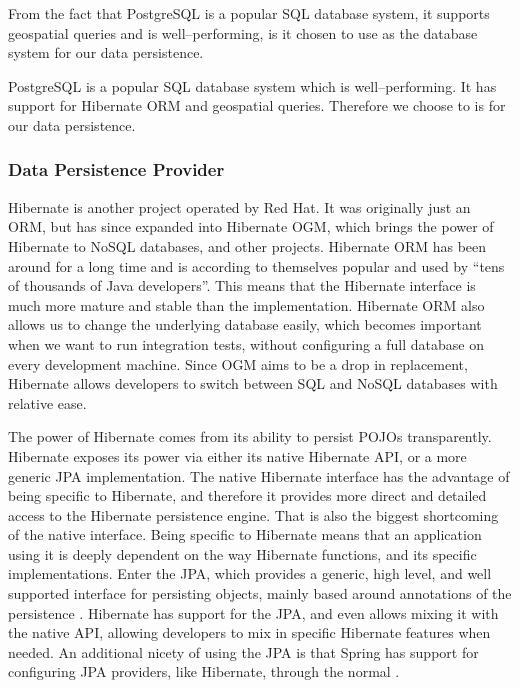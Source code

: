 From the fact that PostgreSQL is a popular SQL database system, it supports geospatial queries and is well--performing,
is it chosen to use as the database system for our data persistence.

PostgreSQL is a popular SQL database system which is well--performing.
It has support for Hibernate ORM and geospatial queries.
Therefore we choose to is for our data persistence.

\subsubsection{Data Persistence Provider}
Hibernate is another project operated by Red Hat.
It was originally just an \ac{ORM}, but has since expanded into Hibernate \ac{OGM}, which brings the power of Hibernate to NoSQL databases, and other projects.
Hibernate ORM has been around for a long time and is according to themselves popular and used by ``tens of thousands of Java developers''.\cite{hibernate_pop}
This means that the Hibernate interface is much more mature and stable than the implementation.
Hibernate \ac{ORM} also allows us to change the underlying database easily, which becomes important when we want to run integration tests, without configuring a full database on every development machine.
Since \ac{OGM} aims to be a drop in replacement, Hibernate allows developers to switch between SQL and NoSQL databases with relative ease.

The power of Hibernate comes from its ability to persist \acp{POJO} transparently.
Hibernate exposes its power via either its native Hibernate API, or a more generic \ac{JPA} implementation.
The native Hibernate interface has the advantage of being specific to Hibernate, and therefore it provides more direct and detailed access to the Hibernate persistence engine.
That is also the biggest shortcoming of the native interface.
Being specific to Hibernate means that an application using it is deeply dependent on the way Hibernate functions, and its specific implementations.
Enter the \ac{JPA}, which provides a generic, high level, and well supported interface for persisting objects, mainly based around annotations of the persistence .
Hibernate has support for the \ac{JPA}, and even allows mixing it with the native API, allowing developers to mix in specific Hibernate features when needed.
An additional nicety of using the \ac{JPA} is that Spring has support for configuring \ac{JPA} providers, like Hibernate, through the normal .


